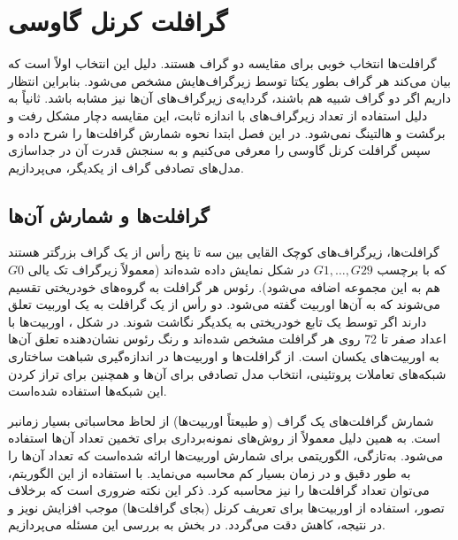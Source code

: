 \chapter{گرافلت کرنل گاوسی}\label{chap:gaussian-graphlet-kernel}
گرافلت‌ها انتخاب خوبی برای مقایسه دو گراف هستند. دلیل این انتخاب اولاً  است که بیان می‌کند هر گراف بطور یکتا توسط زیرگراف‌هایش مشخص می‌شود. بنابراین انتظار داریم اگر دو گراف شبیه هم باشند، گردایه‌ی زیرگراف‌های آن‌ها نیز مشابه باشد. ثانیاً به دلیل استفاده از تعداد زیرگراف‌های با اندازه ثابت، این مقایسه دچار مشکل رفت و برگشت و هالتینگ نمی‌شود.
در این فصل ابتدا نحوه شمارش گرافلت‌ها را شرح داده و سپس گرافلت کرنل گاوسی را معرفی می‌کنیم و به سنجش قدرت آن در جداسازی مدل‌های تصادفی گراف از یکدیگر، می‌پردازیم.

\section{گرافلت‌ها و شمارش آن‌ها}
گرافلت‌ها، زیرگراف‌های کوچک القایی بین سه تا پنج رأس از یک گراف بزرگتر هستند که با برچسب $G1,\ldots,G29$ در شکل  نمایش داده شده‌اند (معمولاً زیرگراف تک یالی $G0$ هم به این مجموعه اضافه می‌شود).  رئوس هر گرافلت به گروه‌های خودریختی تقسیم می‌شوند که به آن‌ها اوربیت گفته می‌شود. دو رأس از یک گرافلت به یک اوربیت تعلق دارند اگر توسط یک تابع خودریختی به یکدیگر نگاشت شوند. در شکل ، اوربیت‌ها با اعداد صفر تا 72 روی هر گرافلت مشخص شده‌اند و رنگ رئوس نشان‌دهنده تعلق آن‌ها به اوربیت‌های یکسان است. از گرافلت‌ها و اوربیت‌ها در اندازه‌گیری شباهت ساختاری شبکه‌های تعاملات پروتئینی، انتخاب مدل تصادفی برای آن‌ها و همچنین برای تراز کردن این شبکه‌ها استفاده شده‌است.

شمارش گرافلت‌های یک گراف (و طبیعتاً اوربیت‌ها) از لحاظ محاسباتی بسیار زمانبر است. به همین دلیل معمولاً از روش‌های نمونه‌برداری برای تخمین تعداد آن‌ها استفاده می‌شود. به‌تازگی، الگوریتمی برای شمارش اوربیت‌ها ارائه شده‌است که تعداد آن‌ها را به طور دقیق و در زمان بسیار کم محاسبه می‌نماید. با استفاده از این الگوریتم، می‌توان تعداد گرافلت‌ها را نیز محاسبه کرد. ذکر این نکته ضروری است که برخلاف تصور، استفاده از اوربیت‌ها برای تعریف کرنل (بجای گرافلت‌ها) موجب افزایش نویز و در نتیجه، کاهش دقت می‌گردد. در بخش  به بررسی این مسئله می‌پردازیم.


